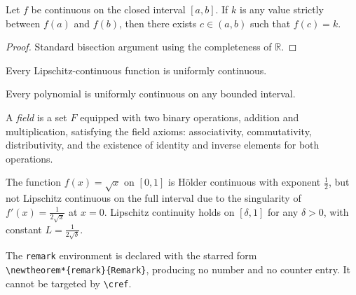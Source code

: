 \lipsum[1]

\begin{theorem}
    \label{thm:ivt}
    Let $f$ be continuous on the closed interval $[a, b]$.
    If $k$ is any value strictly between $f(a)$ and $f(b)$,
    then there exists $c \in (a, b)$ such that $f(c) = k$.
\end{theorem}

\begin{proof}
    Standard bisection argument using the completeness of $\mathbb{R}$.
\end{proof}

\lipsum[1]

\begin{lemma}
    \label{lem:lipschitz}
    Every Lipschitz-continuous function is uniformly continuous.
\end{lemma}

\begin{corollary}
    \label{cor:poly}
    Every polynomial is uniformly continuous on any bounded interval.
\end{corollary}

\lipsum[1]

\begin{definition}
    \label{def:field}
    A \emph{field} is a set $F$ equipped with two binary operations,
    addition and multiplication, satisfying the field axioms: associativity,
    commutativity, distributivity, and the existence of identity and
    inverse elements for both operations.
\end{definition}

\lipsum[1]

\begin{example}
    \label{ex:sqrt}
    The function $f(x) = \sqrt{x}$ on $[0,1]$ is Hölder continuous
    with exponent $\tfrac{1}{2}$, but not Lipschitz continuous on the
    full interval due to the singularity of $f'(x) = \tfrac{1}{2\sqrt{x}}$
    at $x = 0$. Lipschitz continuity holds on $[\delta, 1]$ for any
    $\delta > 0$, with constant $L = \tfrac{1}{2\sqrt{\delta}}$.
\end{example}

\lipsum[1]

\begin{remark}
    \label{rem:starred}
    The \texttt{remark} environment is declared with the starred form\\
    \verb|\newtheorem*{remark}{Remark}|, producing no number and no
    counter entry. It cannot be targeted by \verb|\cref|.
\end{remark}

